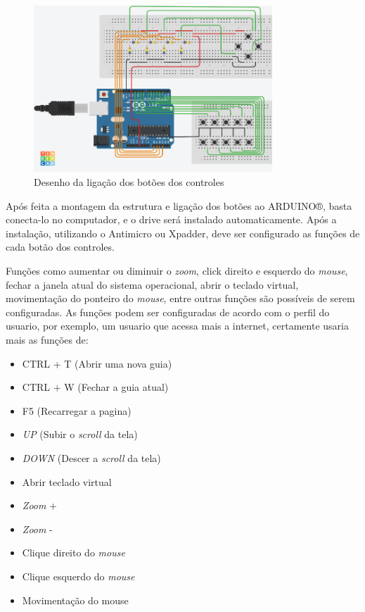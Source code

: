 \documentclass[
	12pt,			%
	openright,		%
	oneside,			%
	a4paper,			%
	chapter=TITLE,		%
	english,			%
	brazil,			%
	]{abntex2}
\begin{document}
\begin{figure}[H]
	\centering
		\includegraphics[width=0.8\textwidth]{./img/img-19.png}
		\caption{Desenho da ligação dos botões dos controles}
		\label{img:img-19}
\end{figure}

Após feita a montagem da estrutura e ligação dos botões ao ARDUINO®, basta conecta-lo no computador, e o drive será instalado automaticamente. Após a instalação, utilizando o Antimicro ou Xpadder, deve ser configurado as funções de cada botão dos controles.

Funções como aumentar ou diminuir o \emph{zoom}, click direito e esquerdo do \emph{mouse}, fechar a janela atual do sistema operacional, abrir o teclado virtual, movimentação do ponteiro do \emph{mouse}, entre outras funções são possíveis de serem configuradas.
As funções podem ser configuradas de acordo com o perfil do usuario, por exemplo, um usuario que acessa mais a internet, certamente usaria mais as funções de:

\begin{itemize}
\item CTRL + T (Abrir uma nova guia)
\item CTRL + W (Fechar a guia atual)
\item F5 (Recarregar a pagina)
\item \emph{UP} (Subir o \emph{scroll} da tela)
\item \emph{DOWN} (Descer a \emph{scroll} da tela)
\item Abrir teclado virtual
\item \emph{Zoom} +
\item \emph{Zoom} -
\item Clique direito do \emph{mouse}
\item Clique esquerdo do \emph{mouse}
\item Movimentação do mouse
\end{itemize}
\end{document}

